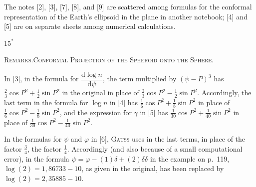 The notes [2], [3], [7], [8], and [9] are scattered among formulas for the conformal representation of the Earth's ellipsoid in the plane in another notebook; [4] and [5] are on separate sheets among numerical calculations.
\par\endgroup
\vfill\hfill$15^*$\hspace*{2cm}\par
\clearpage
{}\hfill{\footnotesize\textsc{Remarks.\quad Conformal Projection of the Spheroid onto the Sphere.}}\par\medskip
\begingroup\small
In [3], in the formula for $\dfrac{\mathrm d\log n}{\mathrm d\psi}$, the term multiplied by $(\psi-P)^3$ has $\tfrac23\cos P^2+\tfrac12\sin P^2$ in the original in place of $\tfrac23\cos P^2-\tfrac12\sin P^2$. Accordingly, the last term in the formula for $\log n$ in [4] has $\tfrac16\cos P^2+\tfrac18\sin P^2$ in place of $\tfrac16\cos P^2-\tfrac18\sin P^2$, and the expression for $\gamma$ in [5] has $\tfrac1{30}\cos P^2+\tfrac1{40}\sin P^2$ in place of $\tfrac1{30}\cos P^2-\tfrac1{40}\sin P^2$.

In the formulas for $\psi$ and $\varphi$ in [6], \textsc{Gauss} uses in the last terms, in place of the factor $\tfrac34$, the factor $\tfrac14$. Accordingly (and also because of a small computational error), in the formula $\psi=\varphi-(1)\delta+(2)\delta\delta$ in the example on p.~119, $\log(2)=1{,}86733-10$, as given in the original, has been replaced by $\log(2)=2{,}35885-10$.

